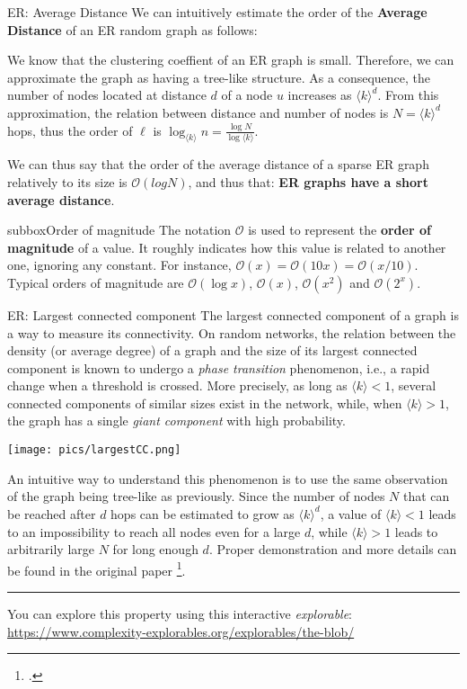 \begin{textbox}{ER: Average Distance}
    We can intuitively estimate the order of the \textbf{Average Distance} of an ER random graph as follows:

    We know that the clustering coeffient of an ER graph is small. Therefore, we can approximate the graph as having a tree-like structure. As a consequence, the number of nodes located at distance $d$ of a node $u$ increases as $\langle k \rangle^d$. From this approximation, the relation between distance and number of nodes is $N=\langle k \rangle^d$ hops, thus the order of $\ell$ is  $\log_{\langle k \rangle}n=\frac{\log N}{\log \langle k \rangle}$.

    We can thus say that the order of the average distance of a sparse ER graph relatively to its size is $\mathcal{O}(log N)$, and thus that: \textbf{ER graphs have a short average distance}.
\end{textbox}


\begin{subbox}{subbox}{Order of magnitude}
    The notation $\mathcal{O}$ is used to represent the \textbf{order of magnitude} of a value. It roughly indicates how this value is related to another one, ignoring any constant. For instance, $\mathcal{O}(x)=\mathcal{O}(10x)=\mathcal{O}(x/10)$. Typical orders of magnitude are $\mathcal{O}(\log x)$, $\mathcal{O}( x)$, $\mathcal{O}(x^2)$ and $\mathcal{O}(2^x)$.
\end{subbox}


\begin{textbox}{ER: Largest connected component}
    The largest connected component of a graph is a way to measure its connectivity. On random networks, the relation between the density (or average degree) of a graph and the size of its largest connected component is known to undergo a \textit{phase transition} phenomenon, i.e., a rapid change when a threshold is crossed. More precisely, as long as $\langle k \rangle<1$, several connected components of similar sizes exist in the network, while, when  $\langle k \rangle>1$, the graph has a single \textit{giant component} with high probability.

    \begin{center}
        \texttt{[image: pics/largestCC.png]}
    \end{center}

    An intuitive way to understand this phenomenon is to use the same observation of the graph being tree-like as previously. Since the number of nodes $N$ that can be reached after $d$ hops can be estimated to grow as $\langle k \rangle^d$, a value of $\langle k \rangle<1$ leads to an impossibility to reach all nodes even for a large $d$, while $\langle k \rangle>1$ leads to arbitrarily large $N$ for long enough $d$. Proper demonstration and more details can be found in the original paper  \footcite{erdHos1960evolution}.

    \noindent\rule{4cm}{0.1pt}

    You can explore this property using this interactive \textit{explorable}: \url{https://www.complexity-explorables.org/explorables/the-blob/}
\end{textbox}


